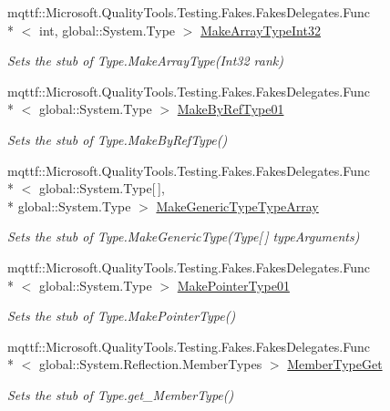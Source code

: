 \begin{DoxyCompactItemize}
mqttf\-::\-Microsoft.\-Quality\-Tools.\-Testing.\-Fakes.\-Fakes\-Delegates.\-Func\\*
$<$ int, global\-::\-System.\-Type $>$ \hyperlink{class_system_1_1_fakes_1_1_stub_type_ab0a5fd3183b98b432e17a9e6b6bdfee0}{Make\-Array\-Type\-Int32}
\begin{DoxyCompactList}\small\item\em Sets the stub of Type.\-Make\-Array\-Type(\-Int32 rank)\end{DoxyCompactList}\item 
mqttf\-::\-Microsoft.\-Quality\-Tools.\-Testing.\-Fakes.\-Fakes\-Delegates.\-Func\\*
$<$ global\-::\-System.\-Type $>$ \hyperlink{class_system_1_1_fakes_1_1_stub_type_abc78973f0cee62dc90294dd13f8f141e}{Make\-By\-Ref\-Type01}
\begin{DoxyCompactList}\small\item\em Sets the stub of Type.\-Make\-By\-Ref\-Type()\end{DoxyCompactList}\item 
mqttf\-::\-Microsoft.\-Quality\-Tools.\-Testing.\-Fakes.\-Fakes\-Delegates.\-Func\\*
$<$ global\-::\-System.\-Type\mbox{[}$\,$\mbox{]}, \\*
global\-::\-System.\-Type $>$ \hyperlink{class_system_1_1_fakes_1_1_stub_type_a4f7ae0065b50bed8648b05398884f751}{Make\-Generic\-Type\-Type\-Array}
\begin{DoxyCompactList}\small\item\em Sets the stub of Type.\-Make\-Generic\-Type(\-Type\mbox{[}$\,$\mbox{]} type\-Arguments)\end{DoxyCompactList}\item 
mqttf\-::\-Microsoft.\-Quality\-Tools.\-Testing.\-Fakes.\-Fakes\-Delegates.\-Func\\*
$<$ global\-::\-System.\-Type $>$ \hyperlink{class_system_1_1_fakes_1_1_stub_type_afc3613e61f7d6507a562daf019cb7468}{Make\-Pointer\-Type01}
\begin{DoxyCompactList}\small\item\em Sets the stub of Type.\-Make\-Pointer\-Type()\end{DoxyCompactList}\item 
mqttf\-::\-Microsoft.\-Quality\-Tools.\-Testing.\-Fakes.\-Fakes\-Delegates.\-Func\\*
$<$ global\-::\-System.\-Reflection.\-Member\-Types $>$ \hyperlink{class_system_1_1_fakes_1_1_stub_type_a1ea09642c2ded9161bb458b03dccbde6}{Member\-Type\-Get}
\begin{DoxyCompactList}\small\item\em Sets the stub of Type.\-get\-\_\-\-Member\-Type()\end{DoxyCompactList}\item 

\end{DoxyCompactItemize}
